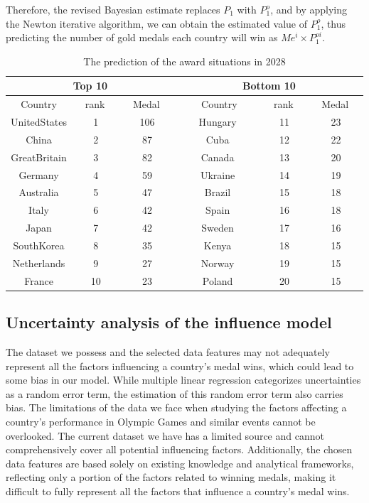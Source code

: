 \documentclass{mcmthesis}
\begin{document}
Therefore, the revised Bayesian estimate replaces $P_{1}$ with $P_{1}^{o}$, and by applying the Newton iterative algorithm, we can obtain the estimated value of $P_{1}^{o}$, thus predicting the number of gold medals each country will win as $Me^{i}\times P_{1}^{oi}$.

\begin{table}
\centering
\caption{ The prediction of the award situations in 2028}
\begin{tabular}{ccc|ccc} 
\hline
\multicolumn{3}{c|}{Top 10}         & \multicolumn{3}{c}{Bottom 10}            \\ 
\hline
Country      & ~ rank~~ & ~ Medal~~ & ~ ~ ~Country~ ~~ & ~ rank~~ & ~ Medal~~  \\ 
\hline
UnitedStates & 1        & 106       & Hungary          & 11       & 23         \\
China        & 2        & 87        & Cuba             & 12       & 22         \\
GreatBritain & 3        & 82        & Canada           & 13       & 20         \\
Germany      & 4        & 59        & Ukraine          & 14       & 19         \\
Australia    & 5        & 47        & Brazil           & 15       & 18         \\
Italy        & 6        & 42        & Spain            & 16       & 18         \\
Japan        & 7        & 42        & Sweden           & 17       & 16         \\
SouthKorea   & 8        & 35        & Kenya            & 18       & 15         \\
Netherlands  & 9        & 27        & Norway           & 19       & 15         \\
France       & 10       & 23        & Poland           & 20       & 15         \\
\hline
\end{tabular}
\end{table}

\subsection{Uncertainty analysis of the influence model}
The dataset we possess and the selected data features may not adequately represent all the factors influencing a country's medal wins, which could lead to some bias in our model. While multiple linear regression categorizes uncertainties as a random error term, the estimation of this random error term also carries bias. The limitations of the data we face when studying the factors affecting a country’s performance in Olympic Games and similar events cannot be overlooked. The current dataset we have has a limited source and cannot comprehensively cover all potential influencing factors. Additionally, the chosen data features are based solely on existing knowledge and analytical frameworks, reflecting only a portion of the factors related to winning medals, making it difficult to fully represent all the factors that influence a country's medal wins.
\end{document}
